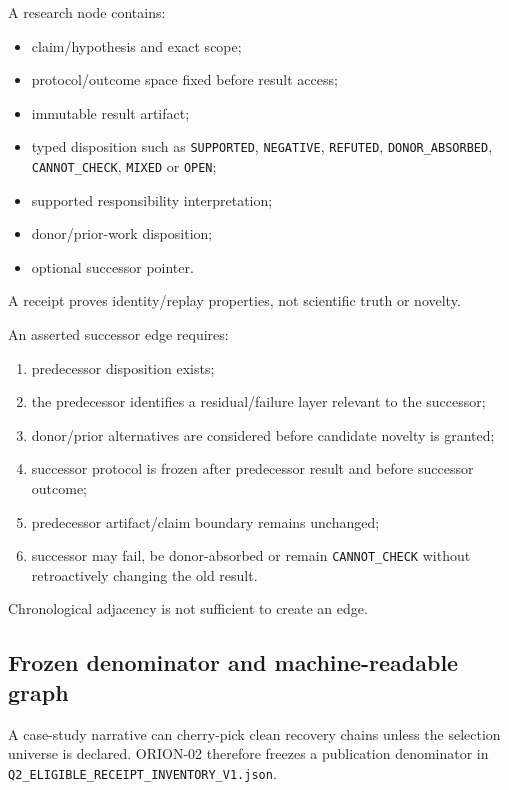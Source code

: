 \documentclass[preprint,12pt]{elsarticle}
\providecommand{\tightlist}{%
  \setlength{\itemsep}{0pt}\setlength{\parskip}{0pt}}
\begin{document}
A research node contains:

\begin{itemize}
\tightlist
\item
  claim/hypothesis and exact scope;
\item
  protocol/outcome space fixed before result access;
\item
  immutable result artifact;
\item
  typed disposition such as \texttt{SUPPORTED}, \texttt{NEGATIVE},
  \texttt{REFUTED}, \texttt{DONOR\_ABSORBED}, \texttt{CANNOT\_CHECK},
  \texttt{MIXED} or \texttt{OPEN};
\item
  supported responsibility interpretation;
\item
  donor/prior-work disposition;
\item
  optional successor pointer.
\end{itemize}

A receipt proves identity/replay properties, not scientific truth or
novelty.

An asserted successor edge requires:

\begin{enumerate}
\def\labelenumi{\arabic{enumi}.}
\tightlist
\item
  predecessor disposition exists;
\item
  the predecessor identifies a residual/failure layer relevant to the
  successor;
\item
  donor/prior alternatives are considered before candidate novelty is
  granted;
\item
  successor protocol is frozen after predecessor result and before
  successor outcome;
\item
  predecessor artifact/claim boundary remains unchanged;
\item
  successor may fail, be donor-absorbed or remain \texttt{CANNOT\_CHECK}
  without retroactively changing the old result.
\end{enumerate}

Chronological adjacency is not sufficient to create an edge.

\hypertarget{frozen-denominator-and-machine-readable-graph}{%
\subsection{Frozen denominator and machine-readable
graph}\label{frozen-denominator-and-machine-readable-graph}}

A case-study narrative can cherry-pick clean recovery chains unless the
selection universe is declared. ORION-02 therefore freezes a publication
denominator in \texttt{Q2\_ELIGIBLE\_RECEIPT\_INVENTORY\_V1.json}.
\end{document}
